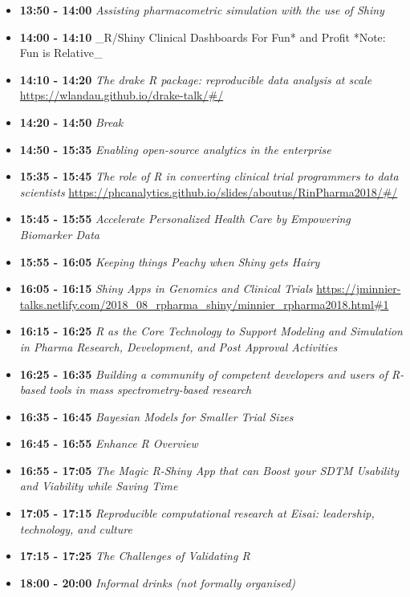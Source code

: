 \documentclass[]{book}
\theoremstyle{definition}
\theoremstyle{definition}
\theoremstyle{definition}
\theoremstyle{remark}
\begin{document}
\begin{itemize}
{  Statistical Programming in R}
  \url{https://kieranjmartin.github.io/R4SPA-talk/r4spa.html\#1}
\item
  \textbf{13:50 - 14:00} \emph{Assisting pharmacometric simulation with
  the use of Shiny}\\
\item
  \textbf{14:00 - 14:10} \_R/Shiny Clinical Dashboards For Fun* and
  Profit *Note: Fun is Relative\_\\
\item
  \textbf{14:10 - 14:20} \emph{The drake R package: reproducible data
  analysis at scale} \url{https://wlandau.github.io/drake-talk/\#/}
\item
  \textbf{14:20 - 14:50} \emph{Break}\\
\item
  \textbf{14:50 - 15:35} \emph{Enabling open-source analytics in the
  enterprise}\\
\item
  \textbf{15:35 - 15:45} \emph{The role of R in converting clinical
  trial programmers to data scientists}
  \url{https://phcanalytics.github.io/slides/aboutus/RinPharma2018/\#/}
\item
  \textbf{15:45 - 15:55} \emph{Accelerate Personalized Health Care by
  Empowering Biomarker Data}\\
\item
  \textbf{15:55 - 16:05} \emph{Keeping things Peachy when Shiny gets
  Hairy}\\
\item
  \textbf{16:05 - 16:15} \emph{Shiny Apps in Genomics and Clinical
  Trials}
  \url{https://jminnier-talks.netlify.com/2018_08_rpharma_shiny/minnier_rpharma2018.html\#1}
\item
  \textbf{16:15 - 16:25} \emph{R as the Core Technology to Support
  Modeling and Simulation in Pharma Research, Development, and Post
  Approval Activities}\\
\item
  \textbf{16:25 - 16:35} \emph{Building a community of competent
  developers and users of R-based tools in mass spectrometry-based
  research}\\
\item
  \textbf{16:35 - 16:45} \emph{Bayesian Models for Smaller Trial
  Sizes}\\
\item
  \textbf{16:45 - 16:55} \emph{Enhance R Overview}\\
\item
  \textbf{16:55 - 17:05} \emph{The Magic R-Shiny App that can Boost your
  SDTM Usability and Viability while Saving Time}\\
\item
  \textbf{17:05 - 17:15} \emph{Reproducible computational research at
  Eisai: leadership, technology, and culture}\\
\item
  \textbf{17:15 - 17:25} \emph{The Challenges of Validating R}\\
\item
  \textbf{18:00 - 20:00} \emph{Informal drinks (not formally organised)}
\end{itemize}
\end{document}
